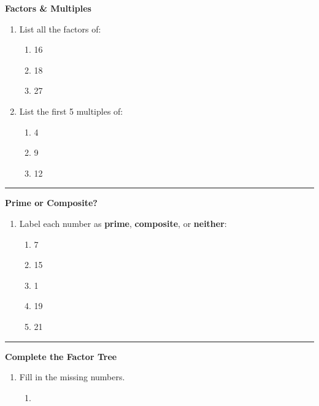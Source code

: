 \documentclass[
  letterpaper,
  DIV=11,
  numbers=noendperiod]{scrreprt}
\providecommand{\tightlist}{%
  \setlength{\itemsep}{0pt}\setlength{\parskip}{0pt}}
\begin{document}
\textbf{Factors \& Multiples}

\begin{enumerate}
\def\labelenumi{\arabic{enumi}.}
\item
  List all the factors of:

  \begin{enumerate}
  \def\labelenumii{\alph{enumii}.}
  \tightlist
  \item
    16
  \item
    18
  \item
    27
  \end{enumerate}
\item
  List the first 5 multiples of:

  \begin{enumerate}
  \def\labelenumii{\alph{enumii}.}
  \tightlist
  \item
    4
  \item
    9
  \item
    12
  \end{enumerate}
\end{enumerate}

\begin{center}\rule{0.5\linewidth}{0.5pt}\end{center}

\textbf{Prime or Composite?}

\begin{enumerate}
\def\labelenumi{\arabic{enumi}.}
\setcounter{enumi}{2}
\tightlist
\item
  Label each number as \textbf{prime}, \textbf{composite}, or
  \textbf{neither}:

  \begin{enumerate}
  \def\labelenumii{\alph{enumii}.}
  \tightlist
  \item
    7
  \item
    15
  \item
    1
  \item
    19
  \item
    21
  \end{enumerate}
\end{enumerate}

\begin{center}\rule{0.5\linewidth}{0.5pt}\end{center}

\textbf{Complete the Factor Tree}

\begin{enumerate}
\def\labelenumi{\arabic{enumi}.}
\setcounter{enumi}{3}
\item
  Fill in the missing numbers.

  \begin{enumerate}
  \def\labelenumii{\alph{enumii}.}
  \tightlist
  \item
  \end{enumerate}
\end{enumerate}
\end{document}
